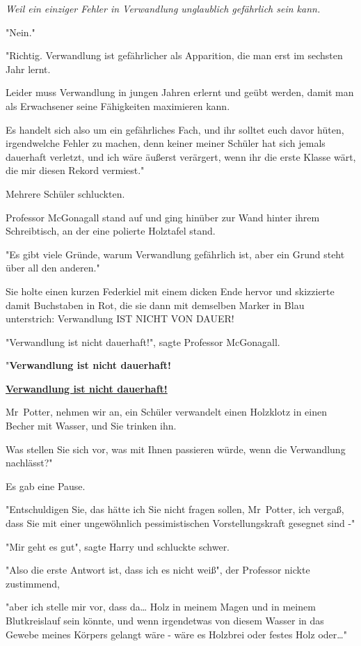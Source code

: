 {\emph{Weil ein einziger Fehler in Verwandlung unglaublich gefährlich sein kann.}

"Nein."

"Richtig. Verwandlung ist gefährlicher als Apparition, die man erst im sechsten Jahr lernt.

Leider muss Verwandlung in jungen Jahren erlernt und geübt werden, damit man als Erwachsener seine Fähigkeiten maximieren kann.

Es handelt sich also um ein gefährliches Fach, und ihr solltet euch davor hüten, irgendwelche Fehler zu machen, denn keiner meiner Schüler hat sich jemals dauerhaft verletzt, und ich wäre äußerst verärgert, wenn ihr die erste Klasse wärt, die mir diesen Rekord vermiest."

Mehrere Schüler schluckten.

Professor McGonagall stand auf und ging hinüber zur Wand hinter ihrem Schreibtisch, an der eine polierte Holztafel stand.

"Es gibt viele Gründe, warum Verwandlung gefährlich ist, aber ein Grund steht über all den anderen."

Sie holte einen kurzen Federkiel mit einem dicken Ende hervor und skizzierte damit Buchstaben in Rot, die sie dann mit demselben Marker in Blau unterstrich: Verwandlung IST NICHT VON DAUER!

"Verwandlung ist nicht dauerhaft!", sagte Professor McGonagall.

"\textbf{Verwandlung ist nicht dauerhaft!}

\textbf{\uline{Verwandlung ist nicht dauerhaft!}}

Mr~Potter, nehmen wir an, ein Schüler verwandelt einen Holzklotz in einen Becher mit Wasser, und Sie trinken ihn.

Was stellen Sie sich vor, was mit Ihnen passieren würde, wenn die Verwandlung nachlässt?"

Es gab eine Pause.

"Entschuldigen Sie, das hätte ich Sie nicht fragen sollen, Mr~Potter, ich vergaß, dass Sie mit einer ungewöhnlich pessimistischen Vorstellungskraft gesegnet sind -"

"Mir geht es gut", sagte Harry und schluckte schwer.

"Also die erste Antwort ist, dass ich es nicht weiß", der Professor nickte zustimmend,

"aber ich stelle mir vor, dass da… Holz in meinem Magen und in meinem Blutkreislauf sein könnte, und wenn irgendetwas von diesem Wasser in das Gewebe meines Körpers gelangt wäre - wäre es Holzbrei oder festes Holz oder…"

}
